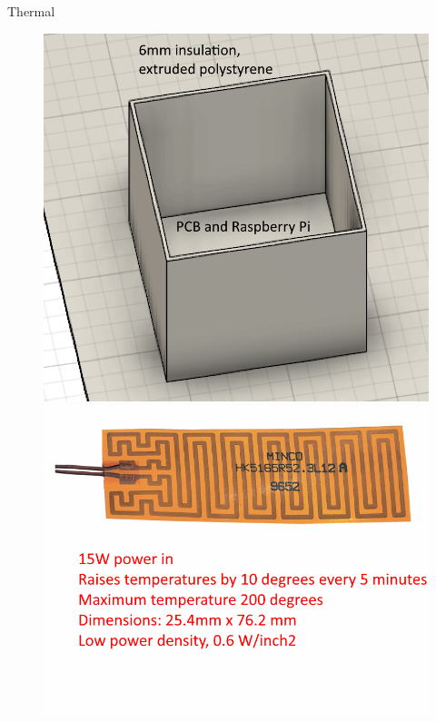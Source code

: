 \documentclass[11pt, aspectratio=169]{beamer}
\begin{document}
\begin{frame}[c]{Thermal}
    \begin{figure}[h!]
        \includegraphics[height=.7\textheight]{images/box.png}
        \includegraphics[height=.7\textheight]{images/mincoheatingpad.png}
    \end{figure}
\end{frame}
\end{document}
